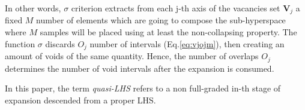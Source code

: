 \documentclass[12pt]{extarticle}
\newcommand{\meqref}[1]{Eq.\ref{#1}}
\begin{document}
In other words, $\sigma$ criterion extracts from each j-th axis of the vacancies set $\textbf{V}_j$ a fixed $M$ number of elements which are going to compose the sub-hyperspace where $M$ samples will be placed using at least the non-collapsing property. The function $\sigma$ discards $O_j$ number of intervals (\meqref{eq:vjojm}), then creating an amount of voids of the same quantity. Hence, the number of overlaps $O_j$ determines the number of void intervals after the expansion is consumed.

In this paper, the term \textit{quasi-LHS} refers to a non full-graded in-th stage of expansion descended from a proper LHS.

\begin{figure}[]
    \centering
    \begin{subfigure}[b]{0.45\textwidth}
        \centering
    \end{subfigure}
    \hspace{0.05\textwidth}
    \begin{subfigure}[b]{0.45\textwidth}
        \centering
        \vtop{
        	\vspace{0pt}
}
\end{subfigure}
\end{figure}
\end{document}
